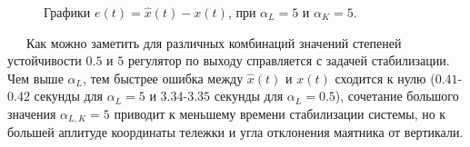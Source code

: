 \begin{figure}[!h]
\caption{Графики $e(t) = \hat{x}(t)-x(t)$, при $\alpha_L = 5$ и $\alpha_K = 5$.}
\label{4_6_55e}
\end{figure}

\newpage
\,
\newpage
\,
\newpage
\,
\newpage
Как можно заметить для различных комбинаций значений степеней устойчивости $0.5$ и $5$ регулятор по выходу справляется с задачей стабилизации. Чем выше $\alpha_L$, тем быстрее ошибка между $\hat{x}(t)$ и $x(t)$ сходится к нулю ($0.41$-$0.42$ секунды для $\alpha_L= 5$ и $3.34$-$3.35$ секунды для $\alpha_L= 0.5$), сочетание большого значения $\alpha_{L,K}=5$ приводит к меньшему времени стабилизации системы, но к большей аплитуде координаты тележки и угла отклонения маятника от вертикали.


\endinput